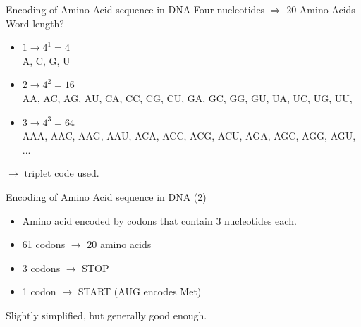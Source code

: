\documentclass[pdf]{beamer}
\newcommand\subHeading[1]{
  \par\bigskip {\Large\bfseries#1}\par\smallskip
}
\begin{document}
\begin{frame}{Encoding of Amino Acid sequence in DNA}
  Four nucleotides $\Rightarrow$  20 Amino Acids\\Word length?
  \begin{itemize}
    \item $1 \rightarrow 4^1 = 4 $\\
      A, C, G, U
      \pause
    \item $2 \rightarrow 4^2 = 16$\\
      AA, AC, AG, AU, CA, CC, CG, CU, GA, GC, GG, GU, UA, UC, UG, UU, 
      \pause
    \item $3 \rightarrow 4^3 = 64$\\
      AAA, AAC, AAG, AAU, ACA, ACC, ACG, ACU, AGA, AGC, AGG, AGU, ...
  \end{itemize}
  \pause
  $\rightarrow$ triplet code used.
\end{frame}

\begin{frame}{Encoding of Amino Acid sequence in DNA (2)}
  \subHeading{Summary}
  \begin{itemize}
    \item Amino acid encoded by codons that contain 3 nucleotides each.
    \item 61 codons $\rightarrow$ 20 amino acids
    \item 3 codons $\rightarrow$ STOP
    \item 1 codon $\rightarrow$ START (AUG encodes Met)
  \end{itemize}
  \tiny Slightly simplified, but generally good enough.
\end{frame}
\end{document}
